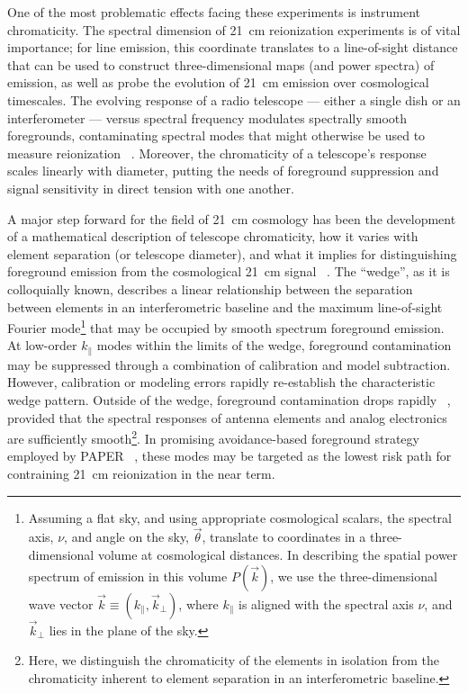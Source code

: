 \documentclass[twocolumn]{emulateapj}
\begin{document}
One of the most problematic effects facing these experiments is instrument
chromaticity.  The spectral dimension of 21~cm reionization experiments is of vital
importance; for line emission, this coordinate translates to a line-of-sight distance
that can be used to construct three-dimensional maps (and power spectra) of emission,
as well as probe the evolution of 21~cm emission over cosmological timescales.
The evolving response of a radio telescope --- either a single dish
or an interferometer --- versus spectral frequency modulates spectrally smooth foregrounds,
contaminating spectral modes that might
otherwise be used to measure reionization ~\citep{XXX}.  Moreover, the chromaticity of
a telescope's response scales linearly with diameter, putting the
needs of foreground suppression and signal sensitivity in direct tension with one
another.

A major step forward for the field of 21~cm cosmology has been the development
of a mathematical description of telescope chromaticity, how it varies with
element separation (or telescope diameter), and what it implies for distinguishing
foreground emission from the cosmological 21~cm signal ~\citep{XXX}.  The ``wedge'', as it is
colloquially known, describes a linear relationship between the separation between elements
in an interferometric baseline and the maximum line-of-sight Fourier mode\footnote{Assuming
a flat sky, and using appropriate
cosmological scalars,
the spectral axis, $\nu$, and angle on the sky, $\vec\theta$, translate to coordinates in
a three-dimensional volume at cosmological distances.  In describing the spatial power spectrum of
emission in this volume $P(\vec k)$, we use the three-dimensional wave vector 
$\vec k\equiv(k_\parallel,\vec k_\perp)$, where $k_\parallel$ is aligned with the
spectral axis $\nu$, and $\vec k_\perp$ lies in the plane of the sky.}
that may be occupied by smooth spectrum foreground emission.  At low-order $k_\parallel$ modes
within the limits of the wedge,
foreground contamination may be suppressed through a combination of calibration and model 
subtraction.  However, calibration or modeling errors rapidly re-establish the characteristic
wedge pattern.  Outside of the wedge, foreground contamination drops rapidly 
~\citep{pober_et_al2013,thargarajan_et_al2015}, provided that the spectral responses
of antenna elements and analog electronics are sufficiently smooth\footnote{Here, we distinguish
the chromaticity of the elements in isolation from the chromaticity inherent to
element separation in an interferometric baseline.}.  In promising avoidance-based
foreground strategy employed by PAPER ~\citep{parsons_et_al2014,ali_et_al2015}, these modes
may be targeted as the lowest risk path for contraining 21~cm reionization in the near term.
\end{document}
